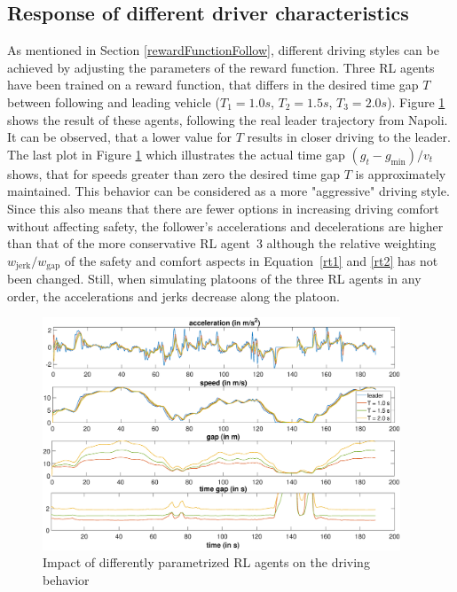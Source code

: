\documentclass[review]{elsarticle}
\providecommand{\sub}[1]{_{\mathrm{#1}}}  %
\providecommand{\3}{{\ss}}
\begin{document}
	
	\subsection{Response of different driver characteristics}
	\label{sec:differentT}
	
	As mentioned in Section \ref{rewardFunctionFollow}, different driving styles
	can be achieved by adjusting the parameters of the reward
	function. Three RL agents have been trained on a reward function, that
	differs in the desired time gap $T$ between following and
	leading vehicle ($T_{1} = 1.0s$, $T_{2} = 1.5s$, 
	$T_{3} =2.0s$). Figure \ref{fig:differentT} shows the result of these agents,
	following the real leader trajectory from Napoli. It can be observed,
	that a lower value for $T$ results in closer driving to the
	leader. The last plot in Figure \ref{fig:differentT} which illustrates the actual time gap $ (g_t-g\sub{min})/v_t$ shows, that for speeds greater than zero the desired time gap $T$ is approximately maintained.
	This behavior can be considered as a more "aggressive"
	driving style. Since this also means that there are fewer options in
	increasing driving comfort without affecting safety, the follower's
	accelerations and decelerations are higher than that of the more
	conservative RL agent~3 although the relative
	weighting $w\sub{jerk}/w\sub{gap}$ of the safety and comfort aspects in Equation~\eqref{rt1} and \eqref{rt2} has not been
	changed. Still, when simulating platoons of the three RL
	agents in any order, the accelerations and jerks decrease along the
	platoon.
	
	\begin{figure}
		\centering
		\includegraphics[width=0.95\textwidth]{images/differentT}
		\caption{Impact of differently parametrized RL agents
			on the driving behavior }
		\label{fig:differentT}
	\end{figure}
	
\end{document}
